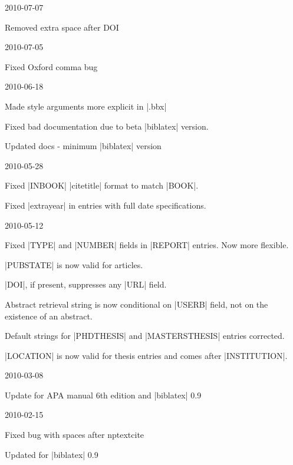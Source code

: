 \documentclass{ltxdockit}
\begin{document}
\begin{changelog}
\begin{release}{1.4}{2010-07-07}
\item Removed extra space after DOI
\end{release}

\begin{release}{1.3}{2010-07-05}
\item Fixed Oxford comma bug
\end{release}

\begin{release}{1.2}{2010-06-18}
\item Made style arguments more explicit in |.bbx|
\item Fixed bad documentation due to beta |biblatex| version.
\item Updated docs - minimum |biblatex| version
\end{release}

\begin{release}{1.1}{2010-05-28}
\item Fixed |INBOOK| |citetitle| format to match |BOOK|.
\item Fixed |extrayear| in entries with full date specifications.
\end{release}

\begin{release}{1.0}{2010-05-12}
\item Fixed |TYPE| and |NUMBER| fields in |REPORT| entries. Now more
  flexible.
\item |PUBSTATE| is now valid for articles.
\item |DOI|, if present, suppresses any |URL| field.
\item Abstract retrieval string is now conditional on |USERB| field, not on
  the existence of an abstract.
\item Default strings for |PHDTHESIS| and |MASTERSTHESIS| entries corrected.
\item |LOCATION| is now valid for thesis entries and comes after |INSTITUTION|.
\end{release}

\begin{release}{0.9}{2010-03-08}
\item Update for APA manual 6th edition and |biblatex| 0.9
\end{release}

\begin{release}{0.8}{2010-02-15}
\item Fixed bug with spaces after nptextcite
\item Updated for |biblatex| 0.9
\end{release}


\end{changelog}
\end{document}
